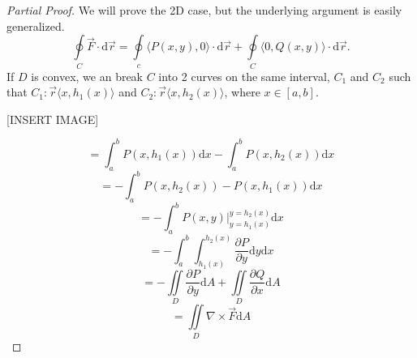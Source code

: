 \begin{proof}[Partial Proof]
	We will prove the 2D case, but the underlying argument is easily generalized.
	\begin{equation*}
		\oint\limits_{C}{\vec{F} \cdot \mathrm{d}\vec{r}} = \oint\limits_{c}{\langle P(x,y), 0 \rangle \cdot \mathrm{d}\vec{r}} + \oint\limits_{C}{\langle 0, Q(x,y) \rangle \cdot \mathrm{d}\vec{r}}.
	\end{equation*}
	If $D$ is convex, we an break $C$ into 2 curves on the same interval, $C_1$ and $C_2$ such that $C_1 : \vec{r} \langle x, h_1(x) \rangle$ and $C_2 : \vec{r} \langle x, h_2(x) \rangle$, where $x \in [a,b]$.
	
	[INSERT IMAGE]
	
	\begin{equation*}
		= \int_{a}^{b}{P(x,h_1(x))\mathrm{d}x} - \int_{a}^{b}{P(x,h_2(x))\mathrm{d}x}
	\end{equation*} \begin{equation*}
		= -\int_{a}^{b}{P(x,h_2(x)) - P(x,h_1(x))\mathrm{d}x}
	\end{equation*} \begin{equation*}
		= -\int_{a}^{b}{P(x,y)\rvert_{y=h_1(x)}^{y=h_2(x)}\mathrm{d}x}
	\end{equation*} \begin{equation*}
		= -\int_{a}^{b}{\int_{h_1(x)}^{h_2(x)}{\frac{\partial P}{\partial y}\mathrm{d}y}\mathrm{d}x}
	\end{equation*} \begin{equation*}
		= -\iint\limits_{D}{\frac{\partial P}{\partial y}\mathrm{d}A} + \iint\limits_{D}{\frac{\partial Q}{\partial x}\mathrm{d}A}
	\end{equation*} \begin{equation*}
		= \iint\limits_{D}{\nabla \times \vec{F}\mathrm{d}A}
	\end{equation*}
\end{proof}

